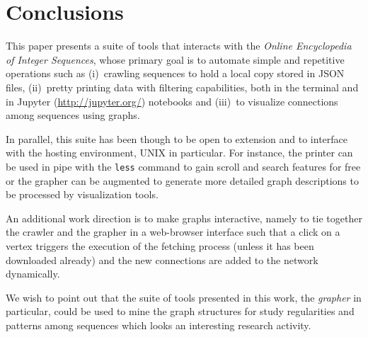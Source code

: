\section*{Conclusions}

This paper presents a suite of tools that interacts with the \textit{Online
Encyclopedia of Integer Sequences}, whose primary goal is to automate simple
and repetitive operations such as (i)~crawling sequences to hold a local copy
stored in JSON files, (ii)~pretty printing data with filtering capabilities,
both in the terminal and in Jupyter (\url{http://jupyter.org/}) notebooks and
(iii)~to visualize connections among sequences using graphs.

In parallel, this suite has been though to be open to extension
and to interface with the hosting environment, UNIX in particular. For
instance, the printer can be used in pipe with the \verb|less| command to gain
scroll and search features for free or the grapher can be augmented to generate
more detailed graph descriptions to be processed by visualization tools.

An additional work direction is to make graphs interactive, namely to tie
together the crawler and the grapher in a web-browser interface such that a
click on a vertex triggers the execution of the fetching process (unless it has
been downloaded already) and the new connections are added to the network
dynamically.

We wish to point out that the suite of tools presented in this work, the
\textit{grapher} in particular, could be used to mine the graph structures
for study regularities and patterns among sequences which looks an interesting
research activity.

